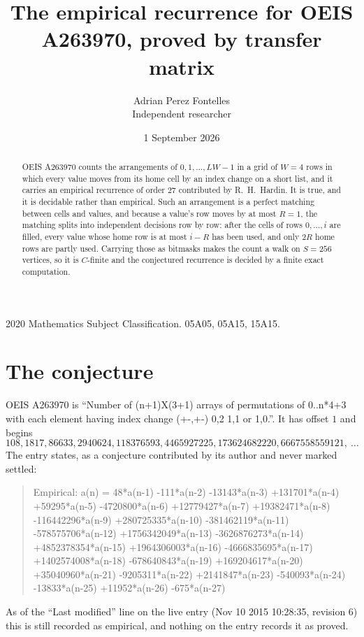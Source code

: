 \documentclass[11pt,a4paper]{article}
\title{The empirical recurrence for OEIS A263970, proved by transfer matrix}
\author{Adrian Perez Fontelles\\ \small Independent researcher}
\date{1 September 2026}
\theoremstyle{plain}
\theoremstyle{definition}
\begin{document}
\maketitle

\begin{abstract}
OEIS A263970 counts the arrangements of $0,1,\dots,LW-1$ in a grid of $W=4$ rows in which
every value moves from its home cell by an index change on a short list, and it carries an
empirical recurrence of order $27$ contributed by R.~H.~Hardin. It is true, and it is
decidable rather than empirical. Such an arrangement is a perfect matching between cells and
values, and because a value's row moves by at most $R=1$, the matching splits into
independent decisions row by row: after the cells of rows $0,\dots,i$ are filled,
every value whose home row is at most $i-R$ has been used, and only $2R$ home rows are
partly used. Carrying those as bitmasks makes the count a walk on $S=256$ vertices, so it is
$C$-finite and the conjectured recurrence is decided by a finite exact computation.
\end{abstract}

\noindent\small 2020 Mathematics Subject Classification. 05A05, 05A15, 15A15.\normalsize

\section{The conjecture}

OEIS A263970 is ``Number of (n+1)X(3+1) arrays of permutations of 0..n*4+3 with each element having index change (+-,+-) 0,2 1,1 or 1,0.''. It has offset $1$ and begins
\[
108, 1817, 86633, 2940624, 118376593, 4465927225, 173624682220, 6667558559121,\ \dots
\]
The entry states, as a conjecture contributed by its author and never marked settled:
\begin{quote}
Empirical: a(n) = 48*a(n-1) -111*a(n-2) -13143*a(n-3) +131701*a(n-4) +59295*a(n-5) -4720800*a(n-6) +12779427*a(n-7) +19382471*a(n-8) -116442296*a(n-9) +280725335*a(n-10) -381462119*a(n-11) -578575706*a(n-12) +1756342049*a(n-13) -3626876273*a(n-14) +4852378354*a(n-15) +1964306003*a(n-16) -4666835695*a(n-17) +1402574008*a(n-18) -678640843*a(n-19) +169204617*a(n-20) +35040960*a(n-21) -9205311*a(n-22) +2141847*a(n-23) -540093*a(n-24) -13833*a(n-25) +11952*a(n-26) -675*a(n-27)
\end{quote}
As of the ``Last modified'' line on the live entry (Nov 10 2015 10:28:35, revision 6) this is still
recorded as empirical, and nothing on the entry records it as proved.
\end{document}
